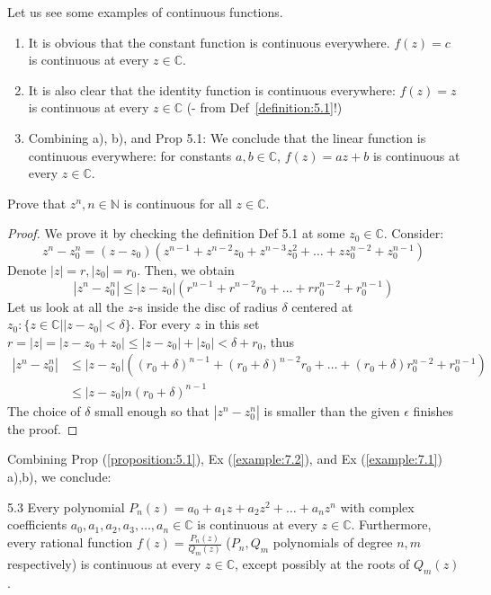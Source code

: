 Let us see some examples of continuous functions.
\begin{example}\label{example:7.1}
    \begin{enumerate}[label=\alph*)]
        \item It is obvious that the constant function is continuous everywhere. $f(z) = c$ is continuous at every $z \in \mathbb{C}$.
        \item It is also clear that the identity function is continuous everywhere: $f(z) = z$ is continuous at every $z \in \mathbb{C}$ (\verifythis - from Def~\ref{definition:5.1}!)
        \item Combining a), b), and Prop 5.1: We conclude that the linear function is continuous everywhere: for constants $a, b \in \mathbb{C}$, $f(z) = az + b$ is continuous at every $z \in \mathbb{C}$.
    \end{enumerate}
\end{example}

\begin{example}\label{example:7.2} Prove that $z^n, n \in \mathbb{N}$ is continuous for all $z \in \mathbb{C}$.
\begin{proof}
    We prove it by checking the definition Def 5.1 at some $z_0 \in \mathbb{C}$. Consider:
\[ z^n - z_0^n = (z - z_0)(z^{n-1} + z^{n-2}z_0 + z^{n-3}z_0^2 + \dots + zz_0^{n-2} + z_0^{n-1}) \]
Denote $|z| = r, |z_0| = r_0$. Then, we obtain
\[ |z^n - z_0^n| \leq |z - z_0|(r^{n-1} + r^{n-2}r_0 + \dots + rr_0^{n-2} + r_0^{n-1}) \]
Let us look at all the $z$-s inside the disc of radius $\delta$ centered at $z_0: \{z \in \mathbb{C} | |z - z_0| < \delta\}$. For every $z$ in this set $r = |z| = |z - z_0 + z_0| \leq |z - z_0| + |z_0| < \delta + r_0$, thus
\begin{align*}
|z^n - z_0^n| &\leq |z - z_0|((r_0 + \delta)^{n-1} + (r_0 + \delta)^{n-2}r_0 + \dots + (r_0 + \delta)r_0^{n-2} + r_0^{n-1}) \\
&\leq |z - z_0| n(r_0 + \delta)^{n-1}
\end{align*}
The choice of $\delta$ small enough so that $|z^n - z_0^n|$ is smaller than the given $\epsilon$ finishes the proof.
\end{proof}
\end{example}

Combining Prop (\ref{proposition:5.1}), Ex (\ref{example:7.2}), and Ex (\ref{example:7.1}) a),b), we conclude:
\begin{proposition}5.3 Every polynomial $P_n(z) = a_0 + a_1 z + a_2 z^2 + \dots + a_n z^n$ with complex coefficients $a_0, a_1, a_2, a_3, \dots, a_n \in \mathbb{C}$ is continuous at every $z \in \mathbb{C}$. Furthermore, every rational function $f(z) = \frac{P_n(z)}{Q_m(z)}$ ($P_n, Q_m$ polynomials of degree $n, m$ respectively) is continuous at every $z \in \mathbb{C}$, except possibly at the roots of $Q_m(z)$.
\end{proposition}

